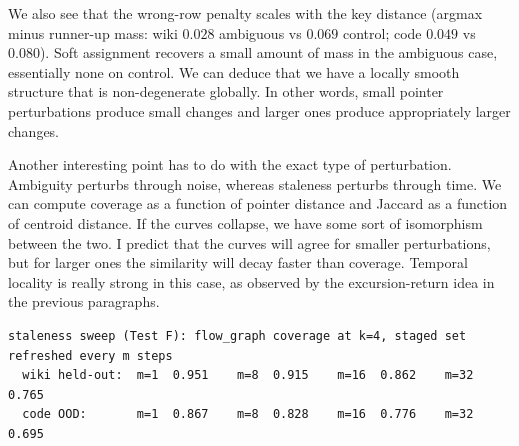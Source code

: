 \documentclass[11pt,a4paper]{article}
\begin{document}
We also see that the wrong-row penalty scales with the key distance (argmax minus runner-up mass: wiki $0.028$ ambiguous vs $0.069$ control; code $0.049$ vs $0.080$). Soft assignment recovers a small amount of mass in the ambiguous case, essentially none on control. We can deduce that we have a locally smooth structure that is non-degenerate globally. In other words, small pointer perturbations produce small changes and larger ones produce appropriately larger changes.

Another interesting point has to do with the exact type of perturbation. Ambiguity perturbs through noise, whereas staleness perturbs through time. We can compute coverage as a function of pointer distance and Jaccard as a function of centroid distance. If the curves collapse, we have some sort of isomorphism between the two. I predict that the curves will agree for smaller perturbations, but for larger ones the similarity will decay faster than coverage. Temporal locality is really strong in this case, as observed by the excursion-return idea in the previous paragraphs.

{\footnotesize
\begin{verbatim}
staleness sweep (Test F): flow_graph coverage at k=4, staged set refreshed every m steps
  wiki held-out:  m=1  0.951    m=8  0.915    m=16  0.862    m=32  0.765
  code OOD:       m=1  0.867    m=8  0.828    m=16  0.776    m=32  0.695
\end{verbatim}
}
\end{document}
